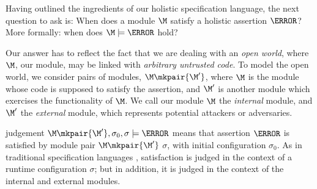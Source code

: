 
Having outlined the ingredients of our holistic specification
language, the next question to ask is: When does a module $\M$ satisfy
a holistic assertion $\A$?  More formally: when does
$\M \models \A$ 
hold? 
  
Our answer has to reflect the fact that we are dealing with an  
\emph{open  world},  where  $\M$, our module, may be
linked with \textit{arbitrary untrusted code}.
%
%
%
%
To %
 model the open world, we consider
 pairs of modules, 
$\M \mkpair {\M'}$,  where $\M$ is the module 
whose code is supposed to satisfy the assertion,
and $\M'$  is  another %
 module which exercises
the functionality of $\M$. We call our module $\M$ the {\em internal} module, and
 $\M'$ the {\em external} module, which represents potential
 attackers or adversaries.

 judgement $\M \mkpair  {\M'},\sigma_0 , \sigma \models \A$ means that  
assertion $\A$ is satisfied by module pair $\M \mkpair  {\M'}$  $\sigma$, with initial configuration $\sigma_0$.  
As in traditional specification languages \cite{Leavens-etal07,Meyer92}, satisfaction is judged 
in the context of a runtime configuration $\sigma$; but in addition, it is judged in the context of the internal and external modules.


     
